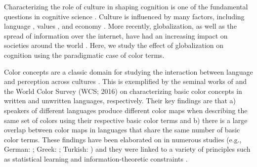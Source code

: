 \label{sec:Introduction}
Characterizing the role of culture in shaping cognition is one of the fundamental questions in cognitive science \parencite{barrett2020towards, henrichWeirdest2010}. Culture is influenced by many factors, including language \parencite{blasi2022over,kramsch2014language}, values \parencite{inglehart2000world,triandis2018individualism}, and economy \parencite{fine2016world,henrich2001search}. More recently, globalization, as well as the spread of information over the internet, have had an increasing impact on societies around the world \parencite{barrett2020towards, pieterse2019globalization}. Here, we study the effect of globalization on cognition using the paradigmatic case of color terms.

Color concepts are a classic domain for studying the interaction between language and perception across cultures \parencite{whorfLanguage2012}. This is exemplified by the seminal works of \textcite{berlinBasic1969} and the World Color Survey (WCS; \textcite{kayWorld2016} 2016) on characterizing basic color concepts in written and unwritten languages, respectively. Their key findings are that a) speakers of different languages produce different color maps when describing the same set of colors using their respective basic color terms and b) there is a large overlap between color maps in languages that share the same number of basic color terms.  These findings have been elaborated on in numerous studies (e.g., German: \textcite{zollingerWhy1984}; Greek: \textcite{thierryUnconscious2009}; Turkish: \textcite{ozgenTurkish1998}) and they were linked to a variety of principles such as statistical learning and information-theoretic constraints \parencite{regierLanguage2009, zaslavskyEfficient2018}.

